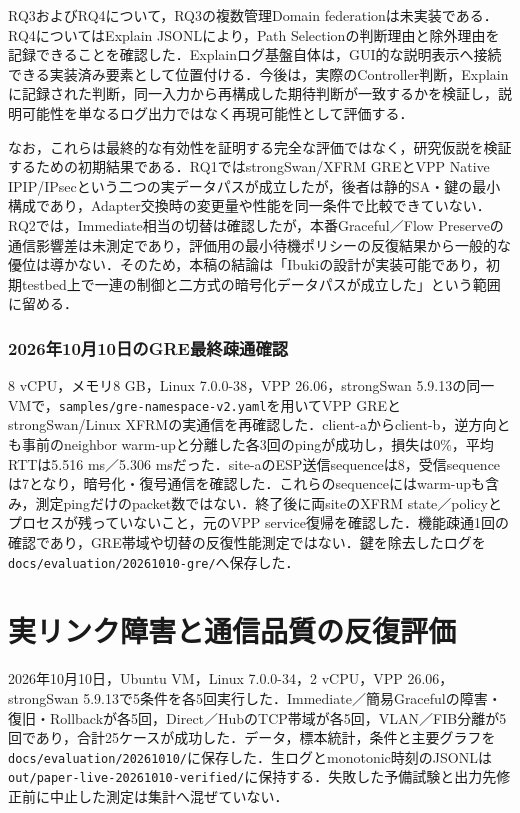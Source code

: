 \documentclass[11pt,a4paper,twoside]{ltjsarticle}
\begin{document}
RQ3およびRQ4について，RQ3の複数管理Domain federationは未実装である．RQ4についてはExplain JSONLにより，Path Selectionの判断理由と除外理由を記録できることを確認した．Explainログ基盤自体は，GUI的な説明表示へ接続できる実装済み要素として位置付ける．今後は，実際のController判断，Explainに記録された判断，同一入力から再構成した期待判断が一致するかを検証し，説明可能性を単なるログ出力ではなく再現可能性として評価する．

なお，これらは最終的な有効性を証明する完全な評価ではなく，研究仮説を検証するための初期結果である．RQ1ではstrongSwan/XFRM GREとVPP Native IPIP/IPsecという二つの実データパスが成立したが，後者は静的SA・鍵の最小構成であり，Adapter交換時の変更量や性能を同一条件で比較できていない．RQ2では，Immediate相当の切替は確認したが，本番Graceful／Flow Preserveの通信影響差は未測定であり，評価用の最小待機ポリシーの反復結果から一般的な優位は導かない．そのため，本稿の結論は「Ibukiの設計が実装可能であり，初期testbed上で一連の制御と二方式の暗号化データパスが成立した」という範囲に留める．

\subsubsection{2026年10月10日のGRE最終疎通確認}
8 vCPU，メモリ8 GB，Linux 7.0.0-38，VPP 26.06，strongSwan 5.9.13の同一VMで，\texttt{samples/gre-namespace-v2.yaml}を用いてVPP GREとstrongSwan/Linux XFRMの実通信を再確認した．client-aからclient-b，逆方向とも事前のneighbor warm-upと分離した各3回のpingが成功し，損失は0\%，平均RTTは5.516 ms／5.306 msだった．site-aのESP送信sequenceは8，受信sequenceは7となり，暗号化・復号通信を確認した．これらのsequenceにはwarm-upも含み，測定pingだけのpacket数ではない．終了後に両siteのXFRM state／policyとプロセスが残っていないこと，元のVPP service復帰を確認した．機能疎通1回の確認であり，GRE帯域や切替の反復性能測定ではない．鍵を除去したログを\texttt{docs/evaluation/20261010-gre/}へ保存した．

\section{実リンク障害と通信品質の反復評価}

2026年10月10日，Ubuntu VM，Linux 7.0.0-34，2 vCPU，VPP 26.06，strongSwan 5.9.13で5条件を各5回実行した．Immediate／簡易Gracefulの障害・復旧・Rollbackが各5回，Direct／HubのTCP帯域が各5回，VLAN／FIB分離が5回であり，合計25ケースが成功した．データ，標本統計，条件と主要グラフを\texttt{docs/evaluation/20261010/}に保存した．生ログとmonotonic時刻のJSONLは\texttt{out/paper-live-20261010-verified/}に保持する．失敗した予備試験と出力先修正前に中止した測定は集計へ混ぜていない．
\end{document}
